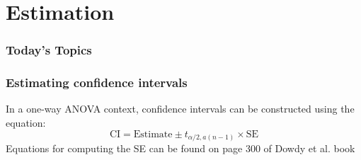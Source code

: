 \documentclass[color=usenames,dvipsnames]{beamer}\usepackage[]{graphicx}\usepackage[]{color}
\begin{document}






\section{Estimation}



\begin{frame}[plain]
  \frametitle{Today's Topics}
  \Large
  \tableofcontents[currentsection]
\end{frame}






\begin{frame}[fragile]
  \frametitle{Estimating confidence intervals}
  In a one-way ANOVA context, confidence intervals can be
  constructed using the equation:
  \[
    \text{CI} = \text{Estimate} \pm t_{\alpha/2,a(n-1)} \times \text{SE}
  \]
  Equations for computing the SE can be found on page 300 of
    Dowdy et al. book
\end{frame}





\end{document}
